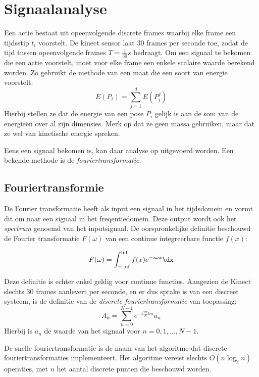 \chapter{Signaalanalyse}
Een actie bestaat uit opeenvolgende discrete frames waarbij elke frame een tijdsstip $t_i$ voorstelt. De kinect sensor laat 30 frames per seconde toe, zodat de tijd tussen opeenvolgende frames $T = \frac{1}{30}s$ bedraagt. Om een signaal te bekomen die een actie voorstelt, moet voor elke frame een enkele scalaire waarde berekend worden. Zo gebruikt de methode van \cite{Shan2014} een maat die een soort van energie voorstelt:
$$E(P_i) = \sum_{j = 1}^{d}E(P_i^j)$$
Hierbij stellen ze dat de energie van een pose $P_i$ gelijk is aan de som van de energieën over al zijn dimensies. Merk op dat ze geen massa gebruiken, maar dat ze wel van kinetische energie spreken. 




Eens een signaal bekomen is, kan daar analyse op uitgevoerd worden. Een bekende methode is de \textit{fouriertransformatie}.

\section{Fouriertransformie}
De Fourier transformatie heeft als input een signaal in het tijdsdomein en vormt dit om naar een signaal in het freqentiedomein. Deze output wordt ook het \textit{spectrum} genoemd van het inputsignaal. De oorspronkelijke definitie beschouwd de Fourier transformatie $F(\omega)$ van een continue integreerbare functie $f(x)$:

$$F(\omega) = \int_{-\inf}^{\inf}f(x)e^{-i\omega x}\dx$$

Deze definitie is echter enkel geldig voor continue functies. Aangezien de Kinect slechts 30 frames aanlevert per seconde, en er dus sprake is van een discreet systeem, is de definitie van de \textit{discrete fouriertransformatie} van toepassing:
$$A_k = \sum_{n=0}^{N-1}e^{-i\frac{2\pi}{N}kn}a_n$$
Hierbij is $a_n$ de waarde van het signaal voor $n = 0, 1, \dots, N - 1$.



De snelle fouriertransformatie \cite{Cooley1965} is de naam van het algoritme dat discrete fouriertransformaties implementeert. Het algoritme vereist slechts $O(n\log_2 n)$ operaties, met $n$ het aantal discrete punten die beschouwd worden. 




















